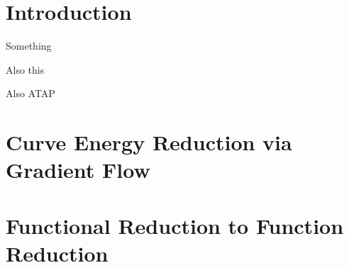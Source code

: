 \documentclass[a4paper, 12pt]{article}
\begin{document}



\tableofcontents
\part{Introduction}


Something \cite{YSC2021}

Also this \cite{BO1995}

Also ATAP \cite{Trefethen_2020}

\newpage
\part{Curve Energy Reduction via Gradient Flow}

\newpage
\part{Functional Reduction to Function Reduction}

\printbibliography
\end{document}

